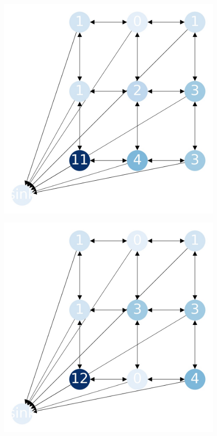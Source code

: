 \documentclass{beamer}
\begin{document}
    \begin{frame}
      \begin{figure}[h!]
        \centering
          \includegraphics[scale=0.25]{sandpile_-24}
      \end{figure}
    \end{frame}
    

    \begin{frame}
      \begin{figure}[h!]
        \centering
          \includegraphics[scale=0.25]{sandpile_-25}
      \end{figure}
    \end{frame}
    
\end{document}
